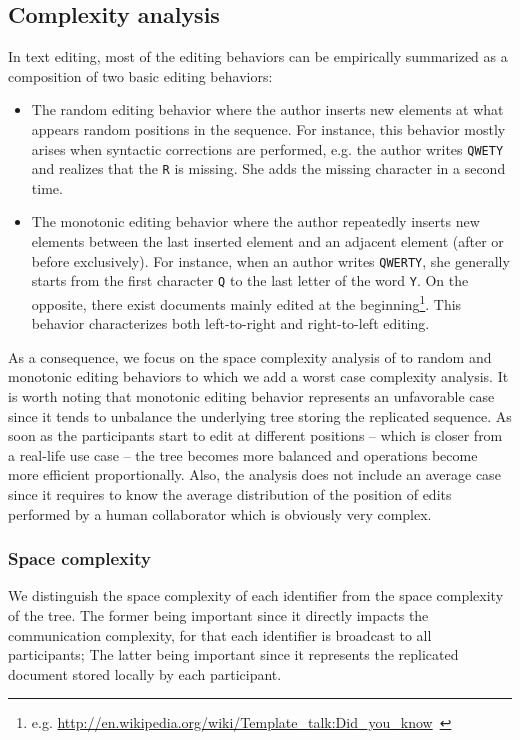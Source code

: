 \subsection{Complexity analysis}
\label{subsec:complexity}

In text editing, most of the editing behaviors can be empirically summarized as
a composition of two basic editing behaviors:
\begin{itemize}[noitemsep, leftmargin=*]
\item The random editing behavior where the author inserts new elements at what
  appears random positions in the sequence. For instance, this behavior mostly
  arises when syntactic corrections are performed, e.g. the author writes
  \texttt{QWETY} and realizes that the \texttt{R} is missing. She adds the
  missing character in a second time.
\item The monotonic editing behavior where the author repeatedly inserts new
  elements between the last inserted element and an adjacent element (after or
  before exclusively). For instance, when an author writes \texttt{QWERTY}, she
  generally starts from the first character \texttt{Q} to the last letter of the
  word \texttt{Y}. On the opposite, there exist documents mainly edited at the
  beginning\footnote{e.g. \url{http://en.wikipedia.org/wiki/Template_talk:Did_you_know}~\cite{nedelec2013lseq}}. This
  behavior characterizes both left-to-right and right-to-left editing.
\end{itemize}

\noindent As a consequence, we focus on the space complexity analysis of \LSEQ
to random and monotonic editing behaviors to which we add a worst case
complexity analysis. It is worth noting that monotonic editing behavior
represents an unfavorable case since it tends to unbalance the underlying tree
storing the replicated sequence. As soon as the participants start to edit at
different positions -- which is closer from a real-life use case -- the tree
becomes more balanced and operations become more efficient proportionally. Also,
the analysis does not include an average case since it requires to know the
average distribution of the position of edits performed by a human collaborator
which is obviously very complex.

\subsubsection{Space complexity}

We distinguish the space complexity of each identifier from the space complexity
of the tree. The former being important since it directly impacts the
communication complexity, for that each identifier is broadcast to all
participants; The latter being important since it represents the replicated
document stored locally by each participant.


